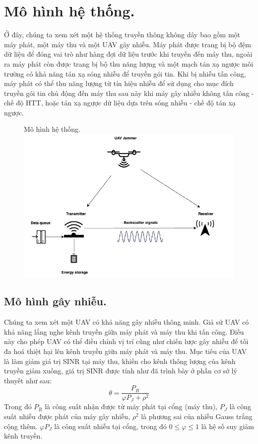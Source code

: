 \documentclass{uetgraduation}
\begin{document}
\section{Mô hình hệ thống.}
Ở đây, chúng ta xem xét một hệ thống truyền thông không dây bao gồm một máy phát, một máy thu và một UAV gây nhiễu. Máy phát được trang bị bộ đệm dữ liệu để đóng vai trò như hàng đợi dữ 
liệu trước khi truyền đến máy thu, ngoài ra máy phát còn được trang bị bộ thu năng lượng và một mạch tán xạ ngược môi trường có khả năng tán xạ sóng nhiễu để truyền gói tin. Khi bị nhiễu
tấn công, máy phát có thể thu năng lượng từ tín hiệu nhiễu để sử dụng cho mục đích truyền gói tin chủ
động đến máy thu sau này khi máy gây nhiễu không tấn công - chế độ HTT, hoặc tán xạ ngược dữ liệu dựa trên sóng nhiễu - chế độ tán xạ ngược.

\begin{figure}{Mô hình hệ thống.}
    \centering
    \includegraphics[scale=0.5]{system_model}
    \label{fig:system_model}
\end{figure}

\subsection{Mô hình gây nhiễu.}
Chúng ta xem xét một UAV có khả năng gây nhiễu thông minh. Giả sử UAV có khả năng lắng nghe kênh truyền giữa máy phát và máy thu khi tấn công. Điều này cho phép UAV có thể điều chỉnh vị trí
cũng như chiến lược gây nhiễu để tối đa hoá thiệt hại lên kênh truyền giữa máy phát và máy thu. Mục tiêu của UAV là làm giảm giá trị SINR tại máy thu, khiến cho kênh thông lượng của kênh
truyền giảm xuống, giá trị SINR được tính như đã trình bày ở phần cơ sở lý thuyết như sau:
\[
\theta = \frac{P_R}{\varphi P_J + \rho^2}
\]
Trong đó $P_R$ là công suất nhận được từ máy phát tại cổng (máy thu), $P_J$ là công suất nhiễu được phát của máy gây nhiễu, $\rho^2$ là phương sai của nhiễu Gauss trắng cộng thêm. 
$\varphi P_J$ là công suất nhiễu tại cổng, trong đó $0 \leq \varphi \leq 1$ là hệ số suy giảm kênh truyền.
\end{document}
